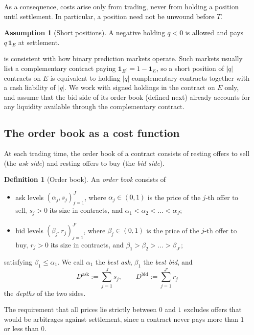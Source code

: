 \documentclass[11pt,a4paper]{article}
\theoremstyle{plain}
\theoremstyle{definition}
\newtheorem{definition}[theorem]{Definition}
\newtheorem{assumption}[theorem]{Assumption}
\theoremstyle{remark}
\newcommand{\1}{\mathbf{1}}
\begin{document}
As a consequence, costs arise only from trading, never from holding a position until settlement. In particular, a position need not be unwound before $T$.

\begin{assumption}[Short positions]
\label{ass:short}
A negative holding $q<0$ is allowed and pays $q\,\1_E$ at settlement.
\end{assumption}

 is consistent with how binary prediction markets operate. Such markets usually list a complementary contract paying $\1_{E^c} = 1-\1_E$, so a short position of $|q|$ contracts on $E$ is equivalent to holding $|q|$ complementary contracts together with a cash liability of $|q|$. We work with signed holdings in the contract on $E$ only, and assume that the bid side of its order book (defined next) already accounts for any liquidity available through the complementary contract.

\subsection{The order book as a cost function}

At each trading time, the order book of a contract consists of resting offers to sell (the \emph{ask side}) and resting offers to buy (the \emph{bid side}).

\begin{definition}[Order book]
\label{def:book}
An \emph{order book} consists of
\begin{itemize}
  \item ask levels $(\alpha_j,s_j)_{j=1}^{J}$, where $\alpha_j\in(0,1)$ is the price of the $j$-th offer to sell, $s_j>0$ its size in contracts, and $\alpha_1<\alpha_2<\dots<\alpha_J$;
  \item bid levels $(\beta_j,r_j)_{j=1}^{J'}$, where $\beta_j\in(0,1)$ is the price of the $j$-th offer to buy, $r_j>0$ its size in contracts, and $\beta_1>\beta_2>\dots>\beta_{J'}$;
\end{itemize}
satisfying $\beta_1\leq\alpha_1$. We call $\alpha_1$ the \emph{best ask}, $\beta_1$ the \emph{best bid}, and
\[
D^{\mathrm{ask}} := \sum_{j=1}^{J} s_j,\qquad D^{\mathrm{bid}} := \sum_{j=1}^{J'} r_j
\]
the \emph{depths} of the two sides.
\end{definition}

The requirement that all prices lie strictly between $0$ and $1$ excludes offers that would be arbitrages against settlement, since a contract never pays more than $1$ or less than $0$.
\end{document}
